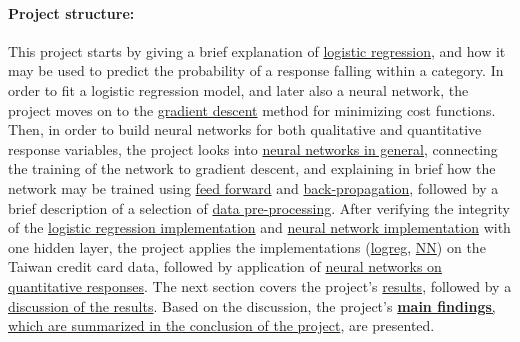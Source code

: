 \documentclass[%
oneside,                 %
final,                   %
10pt]{article}
\begin{document}
\paragraph{Project structure:}
This project starts by giving a brief explanation of  \hyperref[Section_M_Logreg]{logistic regression}, and how it may be used to predict the probability of a response falling within a category. In order to fit a logistic regression model, and later also a neural network, the project moves on to the \hyperref[Section_M_GD]{gradient descent} method for minimizing cost functions. Then, in order to build neural networks for both qualitative and quantitative  response variables, the project looks into \hyperref[Section_M_NN]{neural networks in general}, connecting the training of the network to gradient descent, and explaining in brief how the network may be trained using \hyperref[section_FF]{feed forward} and \hyperref[Section_M_NN]{back-propagation}, followed by a brief description of a selection of \hyperref[Section_M_PP]{ data pre-processing}. After verifying the integrity of the \hyperref[init_logreg]{logistic regression implementation} and \hyperref[init_logreg]{neural network implementation} with one hidden layer, the project applies the implementations (\hyperref[CC_logreg]{logreg},
\hyperref[CC_NN]{NN}) on the Taiwan credit card data, followed by application of \hyperref[FF_NN]{neural networks on quantitative responses}. The next section covers the project's \hyperref[init_logreg]{results}, followed by a  \hyperref[Section_Discussion_of_results]{discussion of the results}. Based on the discussion, the project's  \hyperref[Section_Conclusions]{ \textbf{main findings}, which are summarized in the conclusion of the project}, are presented.
\end{document}
